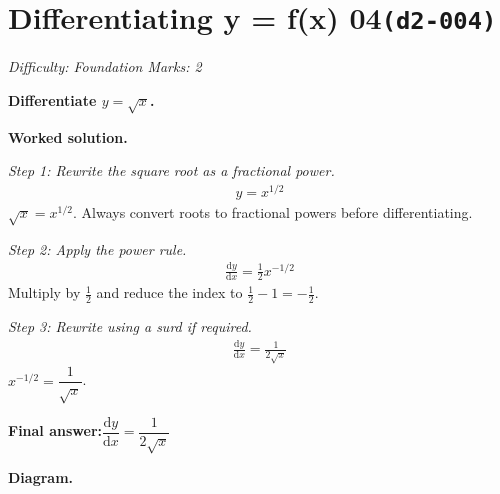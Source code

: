 \documentclass[11pt]{article}
\newcommand{\question}[1]{\par\medskip\noindent\textbf{#1}\par}
\begin{document}
\section*{Differentiating y = f(x) 04\quad\small\texttt{(d2-004)}}
\textit{Difficulty: Foundation \quad\textbar\quad Marks: 2}

\question{Differentiate \( y = \sqrt{x} \).}

\textbf{Worked solution.}

\textit{Step 1: Rewrite the square root as a fractional power.}
\[\begin{gathered}
y = x^{1/2}
\end{gathered}\]
\( \sqrt{x} = x^{1/2} \). Always convert roots to fractional powers before differentiating.

\textit{Step 2: Apply the power rule.}
\[\begin{gathered}
\frac{\mathrm{d}y}{\mathrm{d}x} = \tfrac{1}{2}x^{-1/2}
\end{gathered}\]
Multiply by \( \tfrac{1}{2} \) and reduce the index to \( \tfrac{1}{2} - 1 = -\tfrac{1}{2} \).

\textit{Step 3: Rewrite using a surd if required.}
\[\begin{gathered}
\frac{\mathrm{d}y}{\mathrm{d}x} = \frac{1}{2\sqrt{x}}
\end{gathered}\]
\( x^{-1/2} = \dfrac{1}{\sqrt{x}} \).

\begin{answerbox}
\textbf{Final answer:}\quad \(\displaystyle  \dfrac{\mathrm{d}y}{\mathrm{d}x} = \dfrac{1}{2\sqrt{x}} \)
\end{answerbox}
\textbf{Diagram.}
\end{document}
